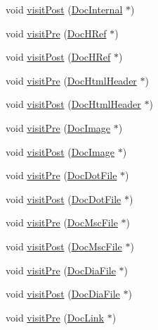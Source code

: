 \begin{DoxyCompactItemize}
\item 
void \hyperlink{class_xml_doc_visitor_af64a74f3b5695a00789c905849a13f4f}{visit\+Post} (\hyperlink{class_doc_internal}{Doc\+Internal} $\ast$)
\item 
void \hyperlink{class_xml_doc_visitor_a0ff56e6672742f78c67d4a7dd2820fb8}{visit\+Pre} (\hyperlink{class_doc_h_ref}{Doc\+H\+Ref} $\ast$)
\item 
void \hyperlink{class_xml_doc_visitor_a28613e459b35f2c5de3426309a5b24ca}{visit\+Post} (\hyperlink{class_doc_h_ref}{Doc\+H\+Ref} $\ast$)
\item 
void \hyperlink{class_xml_doc_visitor_a7a24262492d8e9d2e7ce964a3f4d396f}{visit\+Pre} (\hyperlink{class_doc_html_header}{Doc\+Html\+Header} $\ast$)
\item 
void \hyperlink{class_xml_doc_visitor_aa6ad3827f46d4b60ff001466c9b8d3c8}{visit\+Post} (\hyperlink{class_doc_html_header}{Doc\+Html\+Header} $\ast$)
\item 
void \hyperlink{class_xml_doc_visitor_a12425fffae74c83d2ac47059f50d3f56}{visit\+Pre} (\hyperlink{class_doc_image}{Doc\+Image} $\ast$)
\item 
void \hyperlink{class_xml_doc_visitor_a64f5923e81e33cd19657762917a4cff7}{visit\+Post} (\hyperlink{class_doc_image}{Doc\+Image} $\ast$)
\item 
void \hyperlink{class_xml_doc_visitor_a8526e1c68b2fd599f85d0509ad61c6a9}{visit\+Pre} (\hyperlink{class_doc_dot_file}{Doc\+Dot\+File} $\ast$)
\item 
void \hyperlink{class_xml_doc_visitor_a93b0f22b4522024632823a33320c3731}{visit\+Post} (\hyperlink{class_doc_dot_file}{Doc\+Dot\+File} $\ast$)
\item 
void \hyperlink{class_xml_doc_visitor_a216e77b422639805909201f63e5474c7}{visit\+Pre} (\hyperlink{class_doc_msc_file}{Doc\+Msc\+File} $\ast$)
\item 
void \hyperlink{class_xml_doc_visitor_ae78aaf3f6b79349241b5edf399bf2938}{visit\+Post} (\hyperlink{class_doc_msc_file}{Doc\+Msc\+File} $\ast$)
\item 
void \hyperlink{class_xml_doc_visitor_a452673beb72bf6eb5a0053bab8f4e23b}{visit\+Pre} (\hyperlink{class_doc_dia_file}{Doc\+Dia\+File} $\ast$)
\item 
void \hyperlink{class_xml_doc_visitor_a3d45b64bdbe1a4986876745d52181bb4}{visit\+Post} (\hyperlink{class_doc_dia_file}{Doc\+Dia\+File} $\ast$)
\item 
void \hyperlink{class_xml_doc_visitor_a19c1fd13697f416c7ebc17f13afb9d30}{visit\+Pre} (\hyperlink{class_doc_link}{Doc\+Link} $\ast$)

\end{DoxyCompactItemize}
